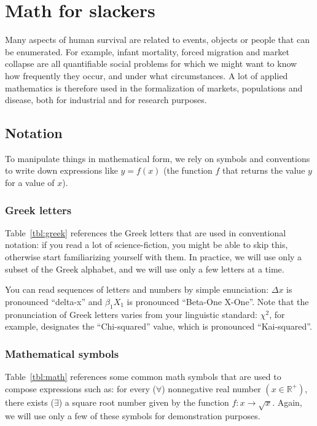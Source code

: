 \chapter{Math for slackers}
  \label{ch:Math for slackers}




Many aspects of human survival are related to events, objects or people that can be enumerated. For example, infant mortality, forced migration and market collapse are all quantifiable social problems for which we might want to know how frequently they occur, and under what circumstances. A lot of applied mathematics is therefore used in the formalization of markets, populations and disease, both for industrial and for research purposes.

\section{Notation}

To manipulate things in mathematical form, we rely on symbols and conventions to write down expressions like $y = f(x)$ (the function $f$ that returns the value $y$ for a value of $x$).

\subsection{Greek letters}%
%
Table~\ref{tbl:greek} references the Greek letters that are used in conventional notation: if you read a lot of science-fiction, you might be able to skip this, otherwise start familiarizing yourself with them. In practice, we will use only a subset of the Greek alphabet, and we will use only a few letters at a time.



You can read sequences of letters and numbers by simple enunciation: $\Delta x$ is pronounced ``delta-x'' and $\beta_1X_1$ is pronounced ``Beta-One X-One''. Note that the pronunciation of Greek letters varies from your linguistic standard: $\chi^2$, for example, designates the ``Chi-squared'' value, which is pronounced ``Kai-squared''.

\subsection{Mathematical symbols}%
%
Table~\ref{tbl:math} references some common math symbols that are used to compose expressions such as: for every ($\forall$) nonnegative real number $(x \in \mathbb{R}^{+})$, there exists ($\exists$) a square root number given by the function $f: x \rightarrow \sqrt{x}$. Again, we will use only a few of these symbols for demonstration purposes.

